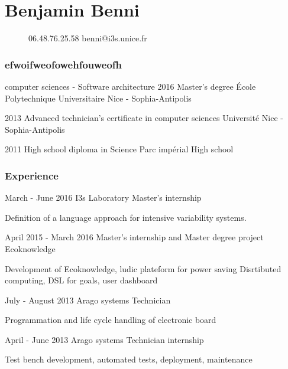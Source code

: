 \documentclass{tccv}
\begin{document}
\part{Benjamin Benni}
\begin{figure}[t]
    {06.48.76.25.58}
    {benni@i3s.unice.fr}
\end{figure}


\section{efwoifweofowehfouweofh}

\begin{yearlist}

\item[computer sciences - Software architecture]{2016}
     {Master's degree}
     {\'Ecole Polytechnique Universitaire Nice - Sophia-Antipolis}

\item{2013}
     {Advanced technician's certificate in computer sciences}
     {Universit\'e Nice - Sophia-Antipolis}

\item{2011}
     {High school diploma in Science}
     {Parc imp\'erial High school}

\end{yearlist}

\section{Experience}

\begin{eventlist}

\item{March - June 2016}
     {I3s Laboratory}
     {Master's internship}

     Definition of a language approach for intensive variability systems.

\item{April 2015 - March 2016}
     {Master's internship and Master degree project}
     {Ecoknowledge}
     
     Development of Ecoknowledge, ludic plateform for power saving
     Disrtibuted computing, DSL for goals, user dashboard


\item{July - August 2013}
     {Arago systems}
     {Technician}
     
     Programmation and life cycle handling of electronic board

     
 \item{April - June 2013}
     {Arago systems}
     {Technician internship}
     
Test bench development, automated tests, deployment, maintenance

     
\end{eventlist}
\end{document}
